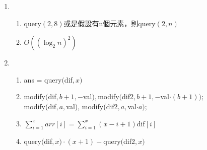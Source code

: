 \documentclass[a4paper, 12pt]{article}
\begin{document}
\begin{enumerate}
\begin{enumerate}
\begin{enumerate}
                    \end{enumerate}
            \end{enumerate}
        \item 
            \begin{enumerate}
                \item query$(2, 8)$或是假設有n個元素，則query$(2, n)$
                \item $O((\log_2 n)^2)$
            \end{enumerate}
        \item 
            \begin{enumerate}
                \item ans = query$($dif$, x)$
                \item modify$($dif$, b+1, -$val$), $modify$($dif2$, b+1, -$val$\cdot (b+1));$\\
                        modify(dif$, a, $val), modify(dif2$, a, $val$\cdot a)$;
                \item $\sum\limits_{i=1}^{x} arr[i] = \sum\limits_{i=1}^{x} (x-i+1)$dif$[i] $
                \item query$($dif$, x)\cdot (x+1) - $query$($dif2$, x)$
            \end{enumerate}
    \end{enumerate}
\end{document}
